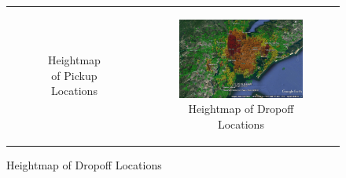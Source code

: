 \documentclass{article}
\begin{document}
\begin{figure}
\begin{tabular}{cc}
\begin{subfigure}{.5\linewidth}
  \caption{Heightmap of Pickup Locations}
  \label{sub:tamount}%
\end{subfigure} &
\begin{subfigure}{.5\linewidth}
  \centering
  \includegraphics[width=.8\linewidth]{dropoff_ne.jpg}
  \caption{Heightmap of Dropoff Locations}
  \label{sub:tip_amount}
\end{subfigure} \\ 

\end{tabular}

\end{figure}

\vfill

\medskip


\end{document}

